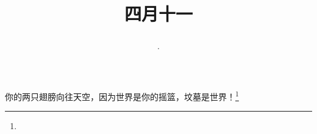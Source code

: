 \title{\date[d=18,m=5,y=2024][year:cn-y,年,month:cn,day:cn,日,·,weekday]·四月十一 }
你的两只翅膀向往天空，因为世界是你的摇篮，坟墓是世界！\footnote{ }

